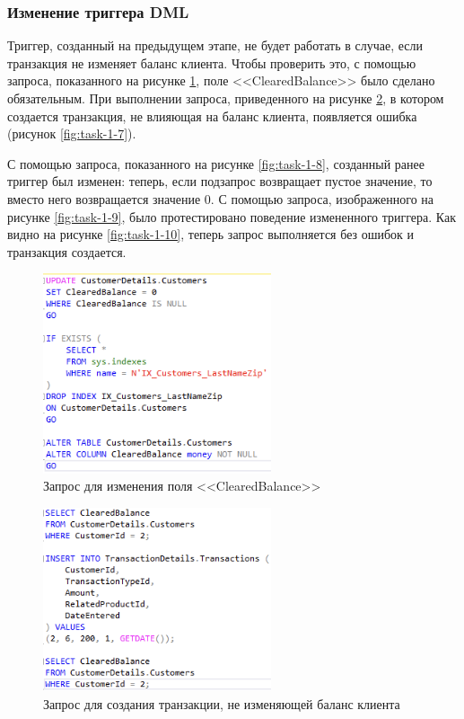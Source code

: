 \documentclass[a4paper, 14pt]{extarticle}
\begin{document}
\subsubsection{Изменение триггера DML}

Триггер, созданный на предыдущем этапе, не будет работать в случае, если
транзакция не изменяет баланс клиента. Чтобы проверить это, с помощью запроса,
показанного на рисунке \ref{fig:task-1-5}, поле
<<\foreignlanguage{english}{ClearedBalance}>> было сделано обязательным. При
выполнении запроса, приведенного на рисунке \ref{fig:task-1-6}, в котором
создается транзакция, не влияющая на баланс клиента, появляется ошибка (рисунок
\ref{fig:task-1-7}).

С помощью запроса, показанного на рисунке \ref{fig:task-1-8}, созданный ранее
триггер был изменен: теперь, если подзапрос возвращает пустое значение, то
вместо него возвращается значение 0. С помощью запроса, изображенного на рисунке
\ref{fig:task-1-9}, было протестировано поведение измененного триггера. Как
видно на рисунке \ref{fig:task-1-10}, теперь запрос выполняется без ошибок и
транзакция создается.

\begin{figure}[H]
  \centering
  \includegraphics[width=0.6\textwidth]{images/task-1/5.png}
  \caption{
    Запрос для изменения поля <<\foreignlanguage{english}{ClearedBalance}>>
  }
  \label{fig:task-1-5}
\end{figure}

\begin{figure}[H]
  \centering
  \includegraphics[width=0.6\textwidth]{images/task-1/6.png}
  \caption{Запрос для создания транзакции, не изменяющей баланс клиента}
  \label{fig:task-1-6}
\end{figure}
\end{document}
